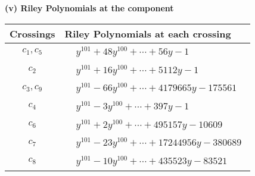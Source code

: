 \documentclass[1p]{elsarticle_modified}
\theoremstyle{definition}
\begin{document}
\newpage\renewcommand{\arraystretch}{1}
\flushleft \textbf{(v) Riley Polynomials at the component}\newline \\
\begin{tabular}{m{50pt}|m{274pt}}
Crossings & \hspace{64pt}Riley Polynomials at each crossing \\
\hline $$\begin{aligned}c_{1},c_{5}\end{aligned}$$&$\begin{aligned}
&y^{101}+48 y^{100}+\cdots+56 y-1
\end{aligned}$\\
\hline $$\begin{aligned}c_{2}\end{aligned}$$&$\begin{aligned}
&y^{101}+16 y^{100}+\cdots+5112 y-1
\end{aligned}$\\
\hline $$\begin{aligned}c_{3},c_{9}\end{aligned}$$&$\begin{aligned}
&y^{101}-66 y^{100}+\cdots+4179665 y-175561
\end{aligned}$\\
\hline $$\begin{aligned}c_{4}\end{aligned}$$&$\begin{aligned}
&y^{101}-3 y^{100}+\cdots+397 y-1
\end{aligned}$\\
\hline $$\begin{aligned}c_{6}\end{aligned}$$&$\begin{aligned}
&y^{101}+2 y^{100}+\cdots+495157 y-10609
\end{aligned}$\\
\hline $$\begin{aligned}c_{7}\end{aligned}$$&$\begin{aligned}
&y^{101}-23 y^{100}+\cdots+17244956 y-380689
\end{aligned}$\\
\hline $$\begin{aligned}c_{8}\end{aligned}$$&$\begin{aligned}
&y^{101}-10 y^{100}+\cdots+435523 y-83521
\end{aligned}$\\

\end{tabular}
\end{document}
